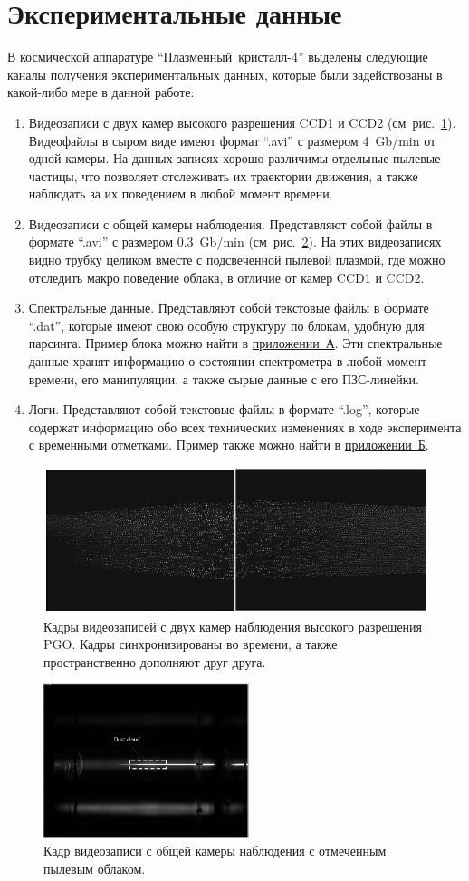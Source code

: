 \section{Экспериментальные данные}
\label{cha:ch_3_4}
В космической аппаратуре “Плазменный~кристалл-4” выделены следующие каналы получения экспериментальных данных,
которые были задействованы в какой-либо мере в данной работе:
\begin{enumerate}
    \item Видеозаписи с двух камер высокого разрешения CCD1 и CCD2 (см~рис.~\ref{fig:fig32}).
    Видеофайлы в сыром виде имеют формат “.avi” с размером 4~Gb/min от одной камеры. На данных записях хорошо
    различимы отдельные пылевые частицы, что позволяет отслеживать их траектории движения, а также наблюдать за
    их поведением в любой момент времени.

    \item Видеозаписи с общей камеры наблюдения. Представляют собой файлы в формате “.avi” с размером 0.3~Gb/min (см~рис.~\ref{fig:fig33}).
    На этих видеозаписях видно трубку целиком вместе с подсвеченной пылевой плазмой, где можно отследить макро поведение
    облака, в отличие от камер CCD1 и CCD2.

    \item Спектральные данные. Представляют собой текстовые файлы в формате “.dat”, которые имеют свою особую структуру
    по блокам, удобную для парсинга. Пример блока можно найти в \hyperref[app:app1]{приложении~А}. Эти спектральные данные
    хранят информацию о состоянии спектрометра в любой момент времени, его манипуляции, а также сырые данные с его ПЗС-линейки.

    \item Логи. Представляют собой текстовые файлы в формате “.log”, которые содержат информацию обо всех
    технических изменениях в ходе эксперимента с временными отметками. Пример также можно найти в \hyperref[app:app2]{приложении~Б}.
\end{enumerate}

\begin{figure}[t]
  \centering
  \includegraphics[width=12cm]{figures/fig32}
  \caption{Кадры видеозаписей с двух камер наблюдения высокого разрешения PGO. Кадры синхронизированы во времени, а также пространственно дополняют друг друга.}
  \label{fig:fig32}
\end{figure}

\begin{figure}[t]
  \centering
  \includegraphics[width=6cm]{figures/fig33}
  \caption{Кадр видеозаписи с общей камеры наблюдения с отмеченным пылевым облаком.}
  \label{fig:fig33}
\end{figure}